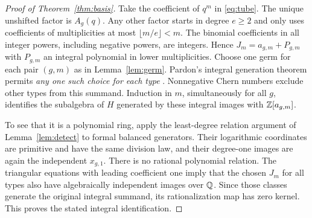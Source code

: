 \begin{proof}[Proof of Theorem~\ref{thm:basis}]
Take the coefficient of $q^m$ in \eqref{eq:tube}. The unique unshifted
factor is $A_g(q)$. Any other factor starts in degree $e\ge2$ and only
uses coefficients of multiplicities at most $\lfloor m/e\rfloor<m$.
The binomial coefficients in all integer powers, including negative
powers, are integers. Hence $J_m=a_{g,m}+P_{g,m}$ with $P_{g,m}$
an integral polynomial in lower multiplicities. Choose one germ for
each pair $(g,m)$ as in Lemma~\ref{lem:germ}. Pardon's integral
generation theorem permits \emph{any one such choice for each type}
\cite[Theorem~6.13]{Pardon}. Nonnegative Chern numbers exclude other
types from this summand. Induction in $m$, simultaneously for all $g$,
identifies the subalgebra of $H$ generated by these integral images with
$\mathbb Z[a_{g,m}]$.

To see that it is a polynomial ring, apply the least-degree relation
argument of Lemma~\ref{lem:detect} to formal balanced generators.
Their logarithmic coordinates are primitive and have the same division
law, and their degree-one images are again the independent $x_{g,1}$.
There is no rational polynomial relation. The triangular equations with
leading coefficient one imply that the chosen $J_m$ for all types
also have algebraically independent images over $\mathbb Q$. Since those
classes generate the original integral summand, its rationalization map
has zero kernel. This proves the stated integral identification.
\end{proof}
